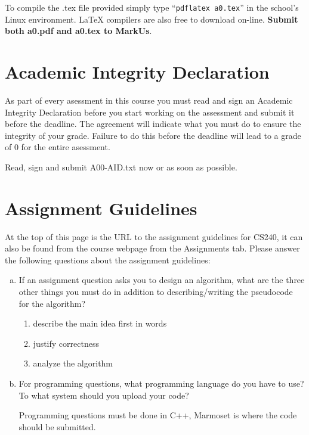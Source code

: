 \documentclass[12pt]{article}
\begin{document}
To compile the .tex file provided simply type ``\texttt{pdflatex a0.tex}'' 
in the school's Linux environment. \LaTeX{} compilers are also free to download on-line.
\textbf{Submit both a0.pdf and a0.tex to MarkUs}.


\clearpage

\addtocounter{section}{-1}
\section{Academic Integrity Declaration}

As part of every asessment in this course you must read and sign
an Academic Integrity Declaration before you start working on the assessment and submit
it before the deadline.
The agreement will indicate what you must do to ensure the integrity of your grade.
Failure to do this before the deadline will lead to a grade of 0 for the entire asessment.

Read, sign and submit A00-AID.txt now or as soon as possible. 


\section{Assignment Guidelines}
\label{sec:assignment-guidelines}

At the top of this page is the URL to the assignment guidelines for CS240, it can also be found from the course webpage from the Assignments tab. Please answer the following questions about the assignment guidelines:

\begin{enumerate}[a)] 
	\item If an assignment question asks you to design an algorithm, what are the three other things you must do in addition to describing/writing the pseudocode for the algorithm?
	\begin{enumerate}[1)]
		\item describe the main idea first in words
		\item justify correctness
		\item analyze the algorithm
	\end{enumerate}
	\item For programming questions, what programming language do you have to use? \\ To what system should you upload your code?
	
Programming questions must be done in C++, Marmoset is where the code should be submitted.
\end{enumerate}
\end{document}
